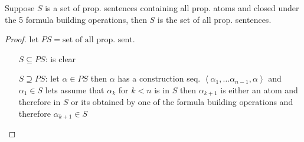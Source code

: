 \noindent{} Suppose $S$ is a set of prop. sentences
containing all prop. atoms and closed under the 5 formula building operations, 
then $S$ is the set of all prop. sentences.
\begin{proof}
    let $PS = \text{set of all prop. sent.}$
    \begin{itemize}[leftmargin=2cm]
        \item[$S\subseteq PS$:] is clear
        \item[$S\supseteq PS$:] let $\alpha\in PS$ then $\alpha$ has a construction seq. $\left\langle \alpha_1,\dots \alpha_{n-1},\alpha\right\rangle$ and $\alpha_1\in S$
        lets assume that $\alpha_k$ for $k<n$ is in $S$ then $\alpha_{k+1}$ is either an atom and therefore in $S$ or its obtained by one of the formula building operations 
        and therefore $\alpha_{k+1}\in S$
    \end{itemize}
\end{proof}
